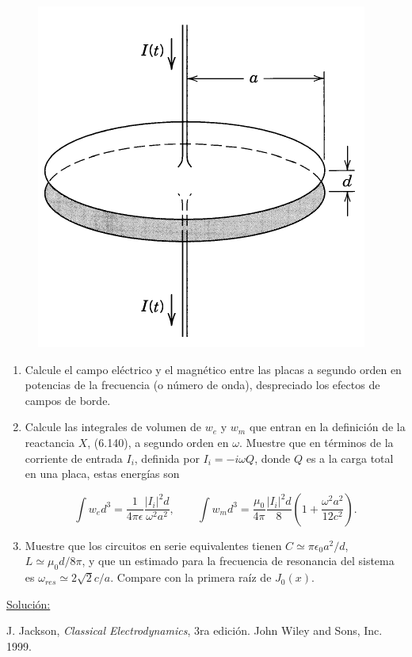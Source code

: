 \documentclass[a4paper,11pt]{article}
\numberwithin{equation}{section}
\begin{document}
\begin{figure}[H]
 \center 
 \includegraphics[scale=0.5]{problema3fig1}
\end{figure}

\begin{enumerate}[label=\textbf{(\alph*)}]
\item Calcule el campo eléctrico y el magnético entre las placas a segundo orden 
en potencias de la frecuencia (o número de onda), despreciado los efectos de campos 
de borde.
\item Calcule las integrales de volumen de $w_e$ y $w_m$ que entran en la definición 
de la reactancia $X$, (6.140), a segundo orden en $\omega$. Muestre que en términos 
de la corriente de entrada $I_i$, definida por $I_i = - i\omega Q$, donde $Q$ es 
a la carga total en una placa, estas energías son 

$$
\int w_e d^3 = \frac{1}{4\pi\epsilon}\frac{|I_i|^2d}{\omega^2 a^2}, \qquad 
\int w_m d^3 = \frac{\mu_0}{4\pi}\frac{|I_i|^2d}{8}\left(1 +
\frac{\omega^2 a^2}{12c^2} \right).
$$
\item Muestre que los circuitos en serie equivalentes tienen $C \simeq \pi\epsilon_0 
a^2/d$, $L \simeq \mu_0d/8\pi$, y que un estimado para la frecuencia de resonancia 
del sistema es $\omega_{res} \simeq 2\sqrt{2}c/a$. Compare con la primera raíz 
de $J_0(x)$.
\end{enumerate}

\vspace{.3cm}

\underline{Solución:} \vspace{.3cm}

\newpage

\begin{thebibliography}{10}
J. Jackson, \emph{Classical Electrodynamics}, 3ra edición. John Wiley and Sons, Inc. 
1999.
\end{thebibliography}
\end{document}
